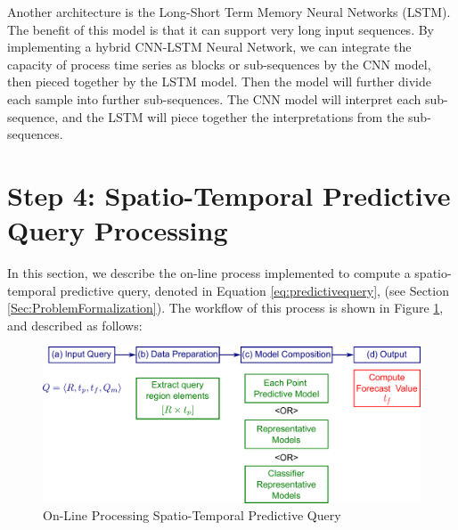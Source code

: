 Another architecture is the Long-Short Term Memory Neural Networks (LSTM). The benefit of this model is that it can support very long input sequences. By implementing a hybrid CNN-LSTM Neural Network, we can integrate the capacity of process time series as blocks or sub-sequences by the CNN model, then pieced together by the LSTM model. Then the model will further divide each sample into further sub-sequences. The CNN model will interpret each sub-sequence, and the LSTM will piece together the interpretations from the sub-sequences. 


\section{Step 4: Spatio-Temporal Predictive Query Processing}
\label{Sec:SpatioTemporalQueryProcessing}	

In this section, we describe the on-line process implemented to compute a spatio-temporal predictive query, denoted in Equation \ref{eq:predictivequery}, (see Section \ref{Sec:ProblemFormalization}). The workflow of this process is shown in Figure \ref{Fig:OnLineQP}, and described as follows: 

\begin{figure}[h]
	\centering
	\includegraphics[scale=0.35]{../Figures/Query_Processing}
	\caption{On-Line Processing Spatio-Temporal Predictive Query}
	\label{Fig:OnLineQP}
\end{figure}

